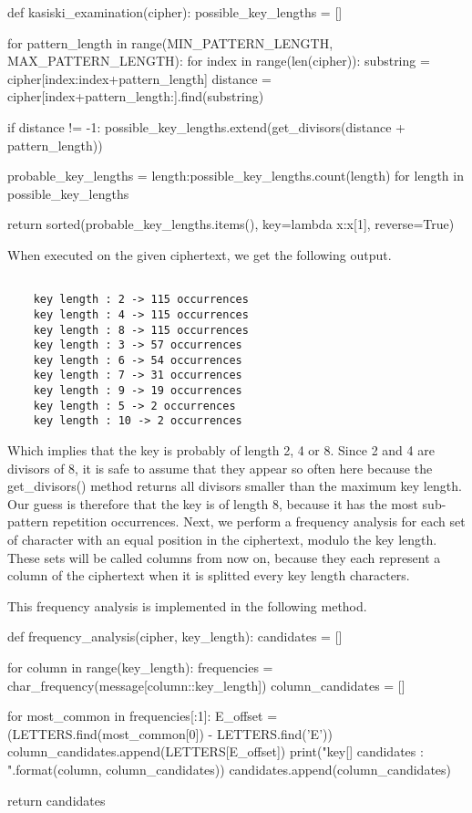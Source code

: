 \documentclass{article}
\begin{document}
\begin{python}
def kasiski_examination(cipher):
    possible_key_lengths = []

    for pattern_length in range(MIN_PATTERN_LENGTH, MAX_PATTERN_LENGTH):
        for index in range(len(cipher)):
            substring = cipher[index:index+pattern_length]
            distance = cipher[index+pattern_length:].find(substring)

            if distance != -1:
                possible_key_lengths.extend(get_divisors(distance + pattern_length))

    probable_key_lengths = {length:possible_key_lengths.count(length) for length in possible_key_lengths}

    return sorted(probable_key_lengths.items(), key=lambda x:x[1], reverse=True)
\end{python}

\bigskip
When executed on the given ciphertext, we get the following output.

\begin{verbatim}

    key length : 2 -> 115 occurrences
    key length : 4 -> 115 occurrences
    key length : 8 -> 115 occurrences
    key length : 3 -> 57 occurrences
    key length : 6 -> 54 occurrences
    key length : 7 -> 31 occurrences
    key length : 9 -> 19 occurrences
    key length : 5 -> 2 occurrences
    key length : 10 -> 2 occurrences

\end{verbatim}

Which implies that the key is probably of length 2, 4 or 8. Since 2 and 4 are divisors of 8, it is safe to assume that they appear so often here because the get\_divisors() method returns all divisors smaller than the maximum key length. Our guess is therefore that the key is of length 8, because it has the most sub-pattern repetition occurrences.
Next, we perform a frequency analysis for each set of character with an equal position in the ciphertext, modulo the key length. These sets will be called columns from now on, because they each represent a column of the ciphertext when it is splitted every key length characters.

This frequency analysis is implemented in the following method.

\bigskip
\begin{python}
def frequency_analysis(cipher, key_length):
    candidates = []

    for column in range(key_length):
        frequencies = char_frequency(message[column::key_length])
        column_candidates = []

        for most_common in frequencies[:1]:
            E_offset = (LETTERS.find(most_common[0]) - LETTERS.find('E')) %
            column_candidates.append(LETTERS[E_offset])
        print("key[{}] candidates : {}".format(column, column_candidates))
        candidates.append(column_candidates)

    return candidates
\end{python}
\bigskip
\end{document}
